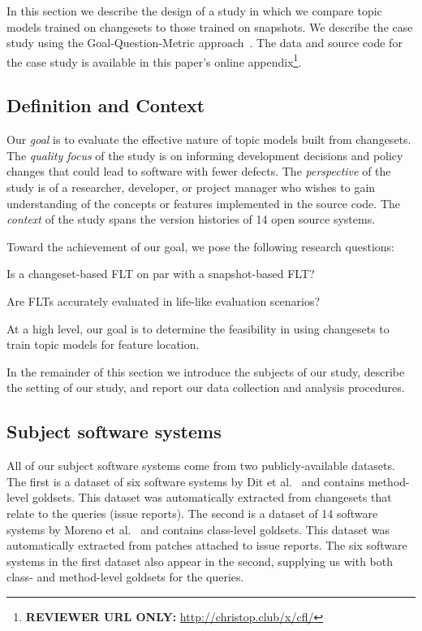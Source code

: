 
In this section we describe the design of a study in which we compare topic models trained on changesets to those trained on snapshots.
We describe the case study using the Goal-Question-Metric approach~\cite{Basili-etal:94}.
The data and source code for the case study is available in this paper's online
appendix\footnote{\textbf{REVIEWER URL ONLY:} \url{http://christop.club/x/cfl/}}.

\subsection{Definition and Context}

Our \textit{goal} is to evaluate the effective nature of topic models built
from changesets.
The \textit{quality focus} of the study is on informing development
decisions and policy changes that could lead to software with fewer
defects.
The \textit{perspective} of the study is of a researcher, developer, or
project manager who wishes to gain understanding of the concepts or
features implemented in the source code.
The \textit{context} of the study spans the version histories of 14
open source systems.

Toward the achievement of our goal, we pose the following research questions:
\begin{description}[font=\itshape\mdseries,leftmargin=10mm,style=sameline]
    \item[RQ1] Is a changeset-based FLT on par with a snapshot-based FLT?
    \item[RQ2] Are FLTs accurately evaluated in life-like evaluation scenarios?
\end{description}

At a high level, our goal is to determine the feasibility in using changesets
to train topic models for feature location.

In the remainder of this section we introduce the subjects of our study,
describe the setting of our study, and report our data collection and analysis procedures.


\subsection{Subject software systems}

All of our subject software systems come from two publicly-available datasets.
The first is a dataset of six software systems by Dit et al.~\cite{Dit-etal:2013} and contains method-level goldsets.
This dataset was automatically extracted from changesets that relate to the queries (issue reports).
The second is a dataset of 14 software systems by Moreno et al.~\cite{Moreno-etal:2014} and contains class-level goldsets.
This dataset was automatically extracted from patches attached to issue reports.
The six software systems in the first dataset also appear in the second,
supplying us with both class- and method-level goldsets for the queries.

